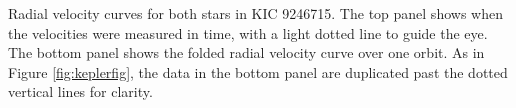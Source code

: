 \label{fig:rvfig} Radial velocity curves for both stars in KIC 9246715. The top panel shows when the velocities were measured in time, with a light dotted line to guide the eye. The bottom panel shows the folded radial velocity curve over one orbit. As in Figure \ref{fig:keplerfig}, the data in the bottom panel are duplicated past the dotted vertical lines for clarity.